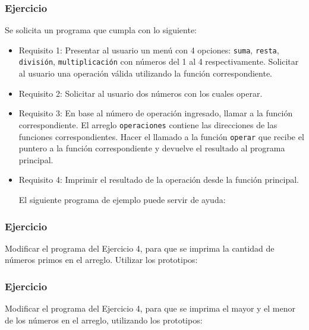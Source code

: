 \subsubsection{Ejercicio}
Se solicita un programa que cumpla con lo siguiente:
\begin{itemize}[a)]
  \item Requisito 1:
    Presentar al usuario un menú con 4 opciones: \texttt{suma}, \texttt{resta}, \texttt{división}, \texttt{multiplicación} con números del 1 al 4 respectivamente. Solicitar al usuario una operación válida utilizando la función correspondiente.

  \item Requisito 2:
    Solicitar al usuario dos números con los cuales operar.

  \item Requisito 3:
    En base al número de operación ingresado, llamar a la función correspondiente. El arreglo \texttt{operaciones} contiene las direcciones de las funciones correspondientes. Hacer el llamado a la función \texttt{operar} que recibe el puntero a la función correspondiente y devuelve el resultado al programa principal.

  \item Requisito 4:
    Imprimir el resultado de la operación desde la función principal.

    El siguiente programa de ejemplo puede servir de ayuda:

    \lstset{inputencoding=utf8/latin1}
    
\end{itemize}

% 

\subsubsection{Ejercicio}
Modificar el programa del Ejercicio 4, para que se imprima la cantidad de números primos en el arreglo. Utilizar los prototipos:
\lstset{inputencoding=utf8/latin1}


\subsubsection{Ejercicio}
Modificar el programa del Ejercicio 4, para que se imprima el mayor y el menor de los números en el arreglo, utilizando los prototipos:
\lstset{inputencoding=utf8/latin1}


